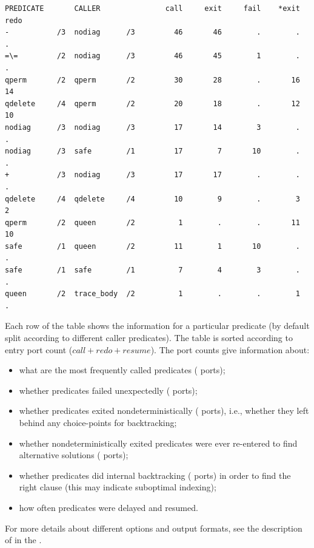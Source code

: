 \begin{verbatim}
PREDICATE       CALLER               call     exit     fail    *exit     redo
-           /3  nodiag      /3         46       46        .        .        .
=\=         /2  nodiag      /3         46       45        1        .        .
qperm       /2  qperm       /2         30       28        .       16       14
qdelete     /4  qperm       /2         20       18        .       12       10
nodiag      /3  nodiag      /3         17       14        3        .        .
nodiag      /3  safe        /1         17        7       10        .        .
+           /3  nodiag      /3         17       17        .        .        .
qdelete     /4  qdelete     /4         10        9        .        3        2
qperm       /2  queen       /2          1        .        .       11       10
safe        /1  queen       /2         11        1       10        .        .
safe        /1  safe        /1          7        4        3        .        .
queen       /2  trace_body  /2          1        .        .        1        .
\end{verbatim}
Each row of the table shows the information for a particular predicate
(by default split according to different caller predicates).
The table is sorted according to entry port count ($call+redo+resume$).
The port counts give information about:
\begin{itemize}
\item what are the most frequently called predicates ( ports);
\item whether predicates failed unexpectedly ( ports);
\item whether predicates exited nondeterministically ( ports),
  i.e.,
    whether they left behind any choice-points for backtracking;
\item whether nondeterministically exited predicates were ever re-entered
    to find alternative solutions ( ports);
\item whether predicates did internal backtracking ( ports) in
  order
    to find the right clause (this may indicate suboptimal indexing);
\item how often predicates were delayed and resumed.
\end{itemize}
For more details about different options and output formats, see
the description of
%
in the .


